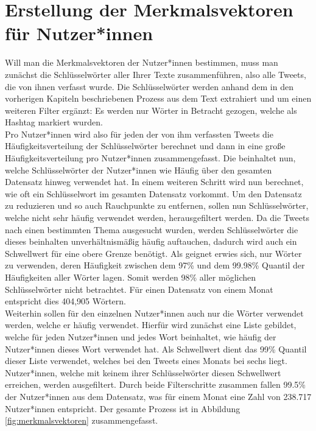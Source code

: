 \section{Erstellung der Merkmalsvektoren für Nutzer*innen}
Will man die Merkmalsvektoren der Nutzer*innen bestimmen, muss man zunächst die Schlüsselwörter aller Ihrer Texte zusammenführen, also alle Tweets, die von ihnen verfasst wurde. Die Schlüsselwörter werden anhand dem in den vorherigen Kapiteln beschriebenen Prozess aus dem Text extrahiert und um einen weiteren Filter ergänzt: Es werden nur Wörter in Betracht gezogen, welche als Hashtag markiert wurden. \\ \newline
Pro Nutzer*innen wird also für jeden der von ihm verfassten Tweets die Häufigkeitsverteilung der Schlüsselwörter berechnet und dann in eine große Häufigkeitsverteilung pro Nutzer*innen zusammengefasst. Die beinhaltet nun, welche Schlüsselwörter der Nutzer*innen wie Häufig über den gesamten Datensatz hinweg verwendet hat. In einem weiteren Schritt wird nun berechnet, wie oft ein Schlüsselwort im gesamten Datensatz vorkommt. Um den Datensatz zu reduzieren und so auch Rauchpunkte zu entfernen, sollen nun Schlüsselwörter, welche nicht sehr häufig verwendet werden, herausgefiltert werden. Da die Tweets nach einen bestimmten Thema ausgesucht wurden, werden Schlüsselwörter die dieses beinhalten unverhältnismäßig häufig auftauchen, dadurch wird auch ein Schwellwert für eine obere Grenze benötigt. Als geignet erwies sich, nur Wörter zu verwenden, deren Häufigkeit zwischen dem 97\% und dem 99.98\% Quantil der Häufigkeiten aller Wörter lagen. Somit werden 98\% aller möglichen Schlüsselwörter nicht betrachtet. Für einen Datensatz von einem Monat entspricht dies 404,905 Wörtern. \\ \newline
Weiterhin sollen für den einzelnen Nutzer*innen auch nur die Wörter verwendet werden, welche er häufig verwendet. Hierfür wird zunächst eine Liste gebildet, welche  für jeden Nutzer*innen und jedes Wort beinhaltet, wie häufig der Nutzer*innen dieses Wort verwendet hat. Als Schwellwert dient das 99\% Quantil dieser Liste verwendet, welches bei den Tweets eines Monats bei sechs liegt. Nutzer*innen, welche mit keinem ihrer Schlüsselwörter diesen Schwellwert erreichen, werden ausgefiltert. Durch beide Filterschritte zusammen fallen 99.5\% der Nutzer*innen aus dem Datensatz, was für einem Monat eine Zahl von 238.717 Nutzer*innen entspricht. Der gesamte Prozess ist in Abbildung \ref{fig:merkmalsvektoren} zusammengefasst.\\ \newline
